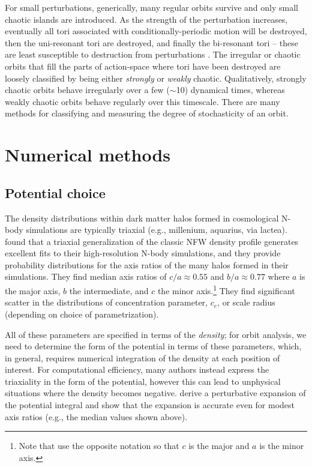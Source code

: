 \documentclass[letterpaper,12pt,preprint]{aastex}
\begin{document}
For small perturbations, generically, many regular orbits survive and only small chaotic islands are introduced. As the strength of the perturbation increases, eventually all tori associated with conditionally-periodic motion will be destroyed, then the uni-resonant tori are destroyed, and finally the bi-resonant tori -- these are least susceptible to destruction from perturbations \citep[e.g., see][]{valluri98}. The irregular or chaotic orbits that fill the parts of action-space where tori have been destroyed are loosely classified by being either \emph{strongly} or \emph{weakly} chaotic. Qualitatively, strongly chaotic orbits behave irregularly over a few ($\sim$10) dynamical times, whereas weakly chaotic orbits behave regularly over this timescale. There are many methods for classifying and measuring the degree of stochasticity of an orbit. 

\section{Numerical methods}

\subsection{Potential choice}

The density distributions within dark matter halos formed in cosmological N-body simulations are typically triaxial (e.g., millenium, aquarius, via lactea). \citet{jing02} found that a triaxial generalization of the classic NFW density profile \citep{navarro96} generates excellent fits to their high-resolution N-body simulations, and they provide probability distributions for the axis ratios of the many halos formed in their simulations. They find median axis ratios of $c/a \approx 0.55$ and $b/a \approx 0.77$ where $a$ is the major axis, $b$ the intermediate, and $c$ the minor axis.\footnote{Note that \citet{jing02} use the opposite notation so that $c$ is the major and $a$ is the minor axis.} They find significant scatter in the distributions of concentration parameter, $c_e$, or scale radius (depending on choice of parametrization). 

All of these parameters are specified in terms of the \emph{density}; for orbit analysis, we need to determine the form of the potential in terms of these parameters, which, in general, requires numerical integration of the density at each position of interest. For computational efficiency, many authors instead express the triaxiality in the form of the potential, however this can lead to unphysical situations where the density becomes negative. \citet{lee03} derive a perturbative expansion of the potential integral and show that the expansion is accurate even for modest axis ratios (e.g., the median values shown above). 
\end{document}
